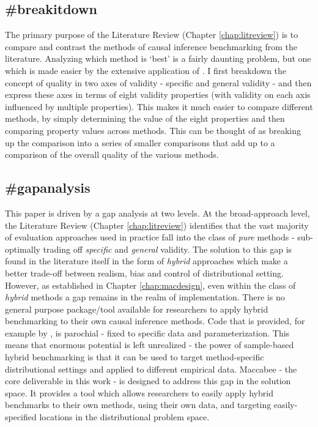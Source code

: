 \documentclass[./main.tex]{subfiles}
\begin{document}

\subsection*{\textbf{\#breakitdown}}
\label{hc:breakitdown}

The primary purpose of the Literature Review (Chapter \ref{chap:litreview}) is to compare and contrast the methods of causal inference benchmarking from the literature. Analyzing which method is `best' is a fairly daunting problem, but one which is made easier by the extensive application of . I first breakdown the concept of quality in two axes of validity - specific and general validity - and then express these axes in terms of eight validity properties (with validity on each axis influenced by multiple properties). This makes it much easier to compare different methods, by simply determining the value of the eight properties and then comparing property values across methods. This can be thought of as breaking up the comparison into a series of smaller comparisons that add up to a comparison of the overall quality of the various methods.


\subsection*{\textbf{\#gapanalysis}}
\label{hc:gapanalysis}

This paper is driven by a gap analysis at two levels. At the broad-approach level, the Literature Review (Chapter \ref{chap:litreview}) identifies that the vast majority of evaluation approaches used in practice fall into the class of \textit{pure} methods - sub-optimally trading off \textit{specific} and \textit{general} validity. The solution to this gap is found in the literature itself in the form of \textit{hybrid} approaches which make a better trade-off between realism, bias and control of distributional setting. However, as established in Chapter \ref{chap:macdesign}, even within the class of \textit{hybrid} methods a gap remains in the realm of implementation. There is no general purpose package/tool available for researchers to apply hybrid benchmarking to their own causal inference methods. Code that is provided, for example by \textcite{Dorie2019Automated1}, is parochial - fixed to specific data and parameterization. This means that enormous potential is left unrealized - the power of sample-based hybrid benchmarking is that it can be used to target method-specific distributional settings and applied to different empirical data. Maccabee - the core deliverable in this work - is designed to address this gap in the solution space. It provides a tool which allows researchers to easily apply hybrid benchmarks to their own methods, using their own data, and targeting easily-specified locations in the distributional problem space.
\end{document}
